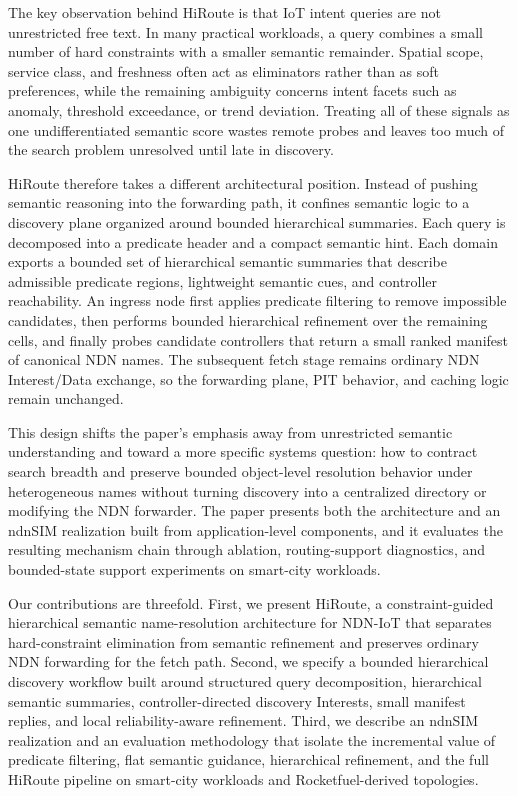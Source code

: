 \documentclass[journal]{IEEEtran}
\newcommand{\sysname}{HiRoute}
\begin{document}
The key observation behind \sysname{} is that IoT intent queries are not unrestricted free text. In many practical workloads, a query combines a small number of hard constraints with a smaller semantic remainder. Spatial scope, service class, and freshness often act as eliminators rather than as soft preferences, while the remaining ambiguity concerns intent facets such as anomaly, threshold exceedance, or trend deviation. Treating all of these signals as one undifferentiated semantic score wastes remote probes and leaves too much of the search problem unresolved until late in discovery.

\sysname{} therefore takes a different architectural position. Instead of pushing semantic reasoning into the forwarding path, it confines semantic logic to a discovery plane organized around bounded hierarchical summaries. Each query is decomposed into a predicate header and a compact semantic hint. Each domain exports a bounded set of hierarchical semantic summaries that describe admissible predicate regions, lightweight semantic cues, and controller reachability. An ingress node first applies predicate filtering to remove impossible candidates, then performs bounded hierarchical refinement over the remaining cells, and finally probes candidate controllers that return a small ranked manifest of canonical NDN names. The subsequent fetch stage remains ordinary NDN Interest/Data exchange, so the forwarding plane, PIT behavior, and caching logic remain unchanged.

This design shifts the paper's emphasis away from unrestricted semantic understanding and toward a more specific systems question: how to contract search breadth and preserve bounded object-level resolution behavior under heterogeneous names without turning discovery into a centralized directory or modifying the NDN forwarder. The paper presents both the architecture and an ndnSIM realization built from application-level components, and it evaluates the resulting mechanism chain through ablation, routing-support diagnostics, and bounded-state support experiments on smart-city workloads.

Our contributions are threefold. First, we present \sysname{}, a constraint-guided hierarchical semantic name-resolution architecture for NDN-IoT that separates hard-constraint elimination from semantic refinement and preserves ordinary NDN forwarding for the fetch path. Second, we specify a bounded hierarchical discovery workflow built around structured query decomposition, hierarchical semantic summaries, controller-directed discovery Interests, small manifest replies, and local reliability-aware refinement. Third, we describe an ndnSIM realization and an evaluation methodology that isolate the incremental value of predicate filtering, flat semantic guidance, hierarchical refinement, and the full \sysname{} pipeline on smart-city workloads and Rocketfuel-derived topologies.
\end{document}
